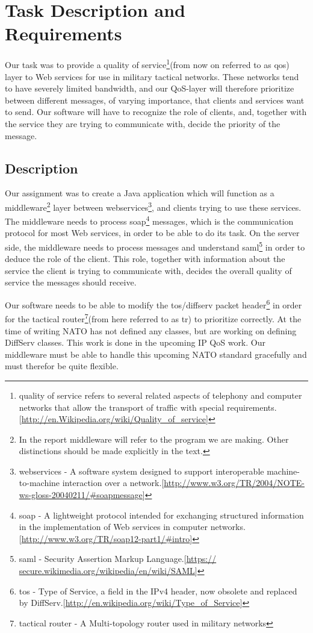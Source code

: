 \section{Task Description and Requirements}\label{Task Description and Requirements} 
    Our task was to provide a \gls{quality of service}\footnote{\gls{quality of service} refers to several related aspects of telephony and computer networks that allow the transport of traffic with special requirements.[\url{http://en.Wikipedia.org/wiki/Quality_of_service}]}(from now on referred to as \gls{qos}) layer to Web services for use in military tactical networks. These networks tend to have severely limited bandwidth, and our QoS-layer will therefore prioritize between different messages, of varying importance, that clients and services want to send. Our software will have to recognize the role of clients, and, together with the service they are trying to communicate with, decide the priority of the message.
    
    \subsection{Description}\label{Description}        
    Our assignment was to create a Java application which will function as a \gls{middleware}\footnote{In the report \gls{middleware} will refer to the program we are making. Other distinctions should be made explicitly in the text.} layer between \glspl{webservice}\footnote{\glspl{webservice} - A software system designed to support interoperable machine-to-machine interaction over a network.[\url{http://www.w3.org/TR/2004/NOTE-ws-gloss-20040211/\#soapmessage}]}, and clients trying to use these services. The middleware needs to process \gls{soap}\footnote{\gls{soap} - A lightweight protocol intended for exchanging structured information in the implementation of Web services in computer networks.[\url{http://www.w3.org/TR/soap12-part1/\#intro}]} messages, which is the communication protocol for most Web services, in order to be able to do its task. On the server side, the middleware needs to process messages and understand \gls{saml}\footnote{\gls{saml} - Security Assertion Markup Language.[\url{https://
secure.wikimedia.org/wikipedia/en/wiki/SAML}]} in order to deduce the role of the client. This role, together with information about the service the client is trying to communicate with, decides the overall quality of service the messages should receive. 

    Our software needs to be able to modify the \gls{tos}/\gls{diffserv} \gls{packet} header\footnote{\gls{tos} - Type of Service, a field in the IPv4 header, now obsolete and replaced by DiffServ.[\url{http://en.wikipedia.org/wiki/Type_of_Service}]} in order for the \Gls{tactical router}\footnote{\Gls{tactical router} - A Multi-topology router used in military networks}(from here referred to as \gls{tr}) to prioritize correctly. At the time of writing NATO has not defined any classes, but are working on defining DiffServ classes. This work is done in the upcoming IP QoS work. Our middleware must be able to handle this upcoming NATO standard gracefully and must therefor be quite flexible.

